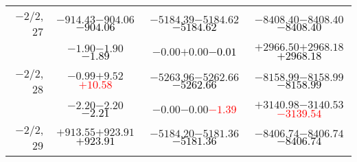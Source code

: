 \documentclass[compress]{beamer}
\begin{document}
\begin{frame}
{\begin{tabular}{r | c | c | c}
$-$2/2, 27 & $-914.43$\hspace{0.1 cm}$-904.06$\hspace{0.1 cm}\textcolor{black}{$-904.06$} & $-5184.39$\hspace{0.1 cm}$-5184.62$\hspace{0.1 cm}\textcolor{black}{$-5184.62$} & $-8408.40$\hspace{0.1 cm}$-8408.40$\hspace{0.1 cm}\textcolor{black}{$-8408.40$} \\
           & $-1.90$\hspace{0.1 cm}$-1.90$\hspace{0.1 cm}\textcolor{black}{$-1.89$} & $-0.00$\hspace{0.1 cm}$+0.00$\hspace{0.1 cm}\textcolor{black}{$-0.01$} & $+2966.50$\hspace{0.1 cm}$+2968.18$\hspace{0.1 cm}\textcolor{black}{$+2968.18$} \\
$-$2/2, 28 & $-0.99$\hspace{0.1 cm}$+9.52$\hspace{0.1 cm}\textcolor{red}{$+10.58$} & $-5263.96$\hspace{0.1 cm}$-5262.66$\hspace{0.1 cm}\textcolor{black}{$-5262.66$} & $-8158.99$\hspace{0.1 cm}$-8158.99$\hspace{0.1 cm}\textcolor{black}{$-8158.99$} \\
           & $-2.20$\hspace{0.1 cm}$-2.20$\hspace{0.1 cm}\textcolor{black}{$-2.21$} & $-0.00$\hspace{0.1 cm}$-0.00$\hspace{0.1 cm}\textcolor{red}{$-1.39$} & $+3140.98$\hspace{0.1 cm}$-3140.53$\hspace{0.1 cm}\textcolor{red}{$-3139.54$} \\
$-$2/2, 29 & $+913.55$\hspace{0.1 cm}$+923.91$\hspace{0.1 cm}\textcolor{black}{$+923.91$} & $-5184.20$\hspace{0.1 cm}$-5181.36$\hspace{0.1 cm}\textcolor{black}{$-5181.36$} & $-8406.74$\hspace{0.1 cm}$-8406.74$\hspace{0.1 cm}\textcolor{black}{$-8406.74$} \\

\end{tabular}}
\end{frame}
\end{document}

